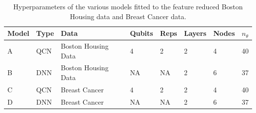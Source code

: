 \begin{table}[H]
\centering
\caption{Hyperparameters of the various models fitted to the feature reduced Boston Housing data and Breast Cancer data.} 
\begin{tabular}{|l|l|l|l|l|l|l|l|}
\hline
Model& Type& Data& Qubits& Reps& Layers & Nodes &$n_{\theta}$ \\ \hline
A    & QCN & Boston Housing Data  & 4     & 2  &2     & 4& 40   \\ \hline
B    & DNN & Boston Housing Data  & NA    & NA &2     & 6& 37 \\ \Xhline{2\arrayrulewidth}
C    & QCN & Breast Cancer        & 4     & 2  &2     & 4& 40  \\ \hline
D    & DNN & Breast Cancer        & NA    & NA &2     & 6& 37  \\ \hline
\end{tabular}

\label{tab:training models PCA}
\end{table}

